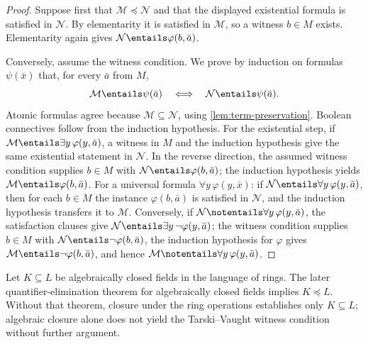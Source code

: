 \begin{proof}
Suppose first that \(\mathcal M\preccurlyeq\mathcal N\) and that the
displayed existential formula is satisfied in \(\mathcal N\).  By
elementarity it is satisfied in
\(\mathcal M\), so a witness \(b\in M\) exists.  Elementarity again gives
\(\mathcal N\entails\varphi(b,\bar a)\).

Conversely, assume the witness condition.  We prove by induction on formulas
\(\psi(\bar x)\) that, for every \(\bar a\) from \(M\),
\[
  \mathcal M\entails\psi(\bar a)
  \quad\Longleftrightarrow\quad
  \mathcal N\entails\psi(\bar a).
\]
Atomic formulas agree because \(\mathcal M\subseteq\mathcal N\), using
\cref{lem:term-preservation}.  Boolean connectives follow from the induction
hypothesis.  For the existential step, if
\(\mathcal M\entails\exists y\,\varphi(y,\bar a)\), a witness in \(M\) and the
induction hypothesis give the same existential statement in \(\mathcal N\).
In the reverse direction, the assumed witness condition supplies \(b\in M\)
with \(\mathcal N\entails\varphi(b,\bar a)\); the induction hypothesis yields
\(\mathcal M\entails\varphi(b,\bar a)\).  For a universal formula
\(\forall y\,\varphi(y,\bar x)\): if
\(\mathcal N\entails\forall y\,\varphi(y,\bar a)\), then for each
\(b\in M\) the instance \(\varphi(b,\bar a)\) is satisfied in
\(\mathcal N\), and the induction hypothesis transfers it to
\(\mathcal M\).  Conversely, if
\(\mathcal N\notentails\forall y\,\varphi(y,\bar a)\), the satisfaction
clauses give \(\mathcal N\entails\exists y\,\neg\varphi(y,\bar a)\); the
witness condition supplies \(b\in M\) with
\(\mathcal N\entails\neg\varphi(b,\bar a)\), the induction hypothesis for
\(\varphi\) gives \(\mathcal M\entails\neg\varphi(b,\bar a)\), and hence
\(\mathcal M\notentails\forall y\,\varphi(y,\bar a)\).
\end{proof}

\begin{example}
Let \(K\subseteq L\) be algebraically closed fields in the language of rings.
The later quantifier-elimination theorem for algebraically closed fields
implies \(K\preccurlyeq L\).  Without that theorem, closure under the ring
operations establishes only \(K\subseteq L\); algebraic closure alone does
not yield the Tarski--Vaught witness condition without further argument.
\end{example}

